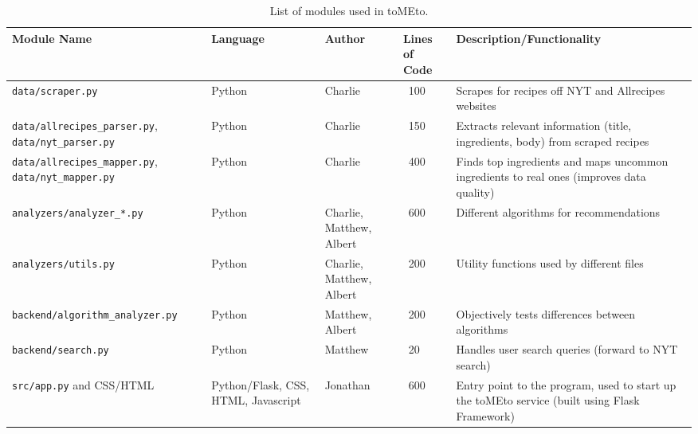 \documentclass{acm_proc_article-sp}
\begin{document}
\begin{table}[h]
    \centering
    \begin{tabular}{ | p{5cm} | p{2cm} | p{2cm} | p{1cm} | p{6cm} |}
    \hline
    Module Name & Language & Author & Lines of Code & Description/Functionality \\  \hline
    \texttt{data/scraper.py} & Python & Charlie & ~100 & Scrapes for recipes off NYT and Allrecipes websites \\ \hline
    \texttt{data/allrecipes\_parser.py},
    \texttt{data/nyt\_parser.py} & Python & Charlie & ~150 & Extracts relevant information (title, ingredients, body) from scraped recipes \\ \hline
    \texttt{data/allrecipes\_mapper.py},
    \texttt{data/nyt\_mapper.py} & Python & Charlie & ~400 & Finds top ingredients and maps uncommon ingredients to real ones (improves data quality) \\ \hline
    \texttt{analyzers/analyzer\_*.py} & Python & Charlie, Matthew, Albert & ~600 & Different algorithms for recommendations \\ \hline
    \texttt{analyzers/utils.py} & Python & Charlie, Matthew, Albert & ~200 & Utility functions used by different files \\ \hline
    \texttt{backend/algorithm\_analyzer.py} & Python & Matthew, Albert & ~200 & Objectively tests differences between algorithms \\ \hline
    \texttt{backend/search.py} & Python & Matthew & ~20 & Handles user search queries (forward to NYT search) \\ \hline
    \texttt{src/app.py} and CSS/HTML & Python/Flask, CSS, HTML, Javascript & Jonathan & ~600 & Entry point to the program, used to start up the toMEto service (built using Flask Framework) \\ \hline
    \end{tabular}
    \caption{List of modules used in toMEto.}
\end{table}
\end{document}
